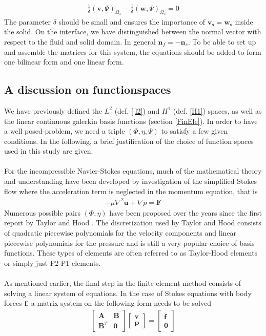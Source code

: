 \begin{align}
\frac{1}{\delta}(\mathbf{v},\Psi)_{\Omega_s} - \frac{1}{\delta}(\mathbf{w},\Psi)_{\Omega_s} = 0 \label{VarMesh2}
\end{align}
The parameter $\delta $ should be small and ensures the importance of $\mathbf{v_s} = \mathbf{w_s}$ inside the solid. On the interface, we have distinguished between the normal vector with respect to the fluid and solid domain. In general $\mathbf{n}_f = -\mathbf{n}_s$. To be able to set up and assemble the matrices for this system, the equations should be added to form one bilinear form and one linear form.



 
\subsection{A discussion on functionspaces}
We have previously defined the $L^2$ (def. \ref{|l2}) and $H^1$ (def. \ref{H1}) spaces, as well as the linear continuous galerkin basis functions (section \ref{FinEle}). In order to have a well posed-problem, we need a triple $(\Phi,\eta, \Psi)$ to satisfy a few given conditions. In the following, a brief justification of the choice of function spaces used in this study are given. \\
\\
For the incompressible Navier-Stokes equations, much of the mathematical theory and understanding have been developed by investigation of the simplified Stokes flow where the acceleration term is neglected in the momentum equation, that is
\begin{align}
-\mu\nabla^2\mathbf{u} + \nabla p = \mathbf{F}
\end{align} Numerous possible pairs $(\Phi, \eta)$ have been proposed over the years since the first report by Taylor and Hood \cite{Tayl73}. The discretization used by Taylor and Hood consists of quadratic piecewise polynomials for the velocity components and linear piecewise polynomials for the pressure and is still a very popular choice of basis functions. These types of elements are often referred to as Taylor-Hood elements or simply just P2-P1 elements. 
\\
\\
As mentioned earlier, the final step in the finite element method consists of solving a linear system of equations. In the case of Stokes equations with body forces $\mathbf{f}$, a matrix system on the following form needs to be solved
\begin{align}
\begin{bmatrix}
\mathbf{A} & \mathbf{B} \\
\mathbf{B}^T & \mathbf{0}
\end{bmatrix}
\begin{bmatrix}
\mathbf{v} \\
\mathbf{p}
\end{bmatrix}   = 
\begin{bmatrix}
\mathbf{f} \\
\mathbf{0}
\end{bmatrix}
\end{align}
